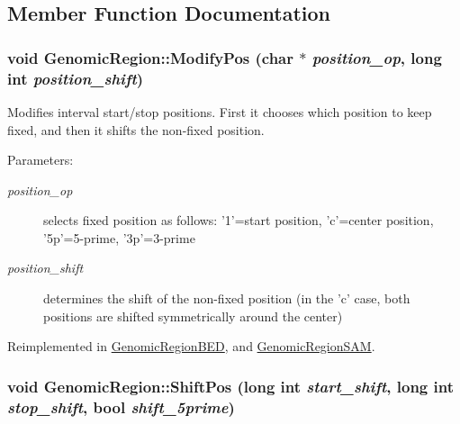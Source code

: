  

\subsection{Member Function Documentation}
\hypertarget{classGenomicRegion_0721b07af0850057e4ab9cd416ecac2f}{
\subsubsection[ModifyPos]{\setlength{\rightskip}{0pt plus 5cm}void GenomicRegion::ModifyPos (char $\ast$ {\em position\_\-op}, \/  long int {\em position\_\-shift})}}
\label{classGenomicRegion_0721b07af0850057e4ab9cd416ecac2f}


Modifies interval start/stop positions. First it chooses which position to keep fixed, and then it shifts the non-fixed position. 

\begin{Desc}
\item[Parameters:]
\begin{description}
\item[{\em position\_\-op}]selects fixed position as follows: '1'=start position, 'c'=center position, '5p'=5-prime, '3p'=3-prime \item[{\em position\_\-shift}]determines the shift of the non-fixed position (in the 'c' case, both positions are shifted symmetrically around the center) \end{description}
\end{Desc}


Reimplemented in \hyperlink{classGenomicRegionBED_c515c70f443db400f911452ed359433b}{GenomicRegionBED}, and \hyperlink{classGenomicRegionSAM_353207352073db00dee0a9b620dca197}{GenomicRegionSAM}.\hypertarget{classGenomicRegion_dc42fea61283fa8134d65467b2292405}{
\subsubsection[ShiftPos]{\setlength{\rightskip}{0pt plus 5cm}void GenomicRegion::ShiftPos (long int {\em start\_\-shift}, \/  long int {\em stop\_\-shift}, \/  bool {\em shift\_\-5prime})}}
\label{classGenomicRegion_dc42fea61283fa8134d65467b2292405}


